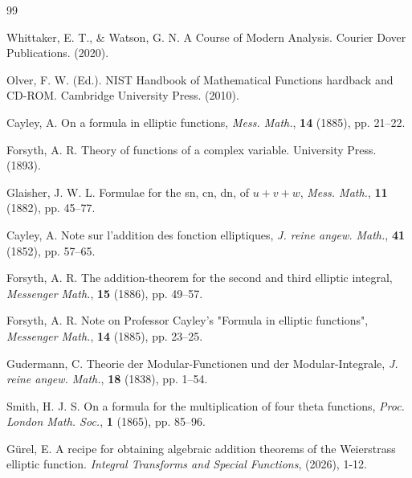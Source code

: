 \documentclass{amsart}
\theoremstyle{definition}
\begin{document}
\begin{thebibliography}{99}

 Whittaker, E. T., \& Watson, G. N. A Course of Modern Analysis. Courier Dover Publications. (2020).

 Olver, F. W. (Ed.). NIST Handbook of Mathematical Functions hardback and CD-ROM. Cambridge University Press. (2010).

 Cayley, A. On a formula in elliptic functions, \textit{Mess. Math.}, \textbf{14} (1885), pp. 21–22.


 Forsyth, A. R. Theory of functions of a complex variable. University Press. (1893).

 Glaisher, J. W. L. Formulae for the sn, cn, dn, of $u + v + w$, \textit{Mess. Math.}, \textbf{11} (1882), pp. 45–77.

 Cayley, A. Note sur l’addition des fonction elliptiques, \textit{J. reine angew. Math.}, \textbf{41} (1852), pp. 57–65.


 Forsyth,  A. R. The addition-theorem for the second and third elliptic integral,\textit{ Messenger Math.}, \textbf{15} (1886), pp. 49–57.


Forsyth,  A. R. Note on Professor Cayley’s "Formula in elliptic functions", \textit{Messenger Math.}, \textbf{14} (1885), pp. 23–25.

 Gudermann, C. Theorie der Modular-Functionen und der Modular-Integrale, \textit{J. reine angew. Math.},
\textbf{18} (1838), pp. 1–54.

  Smith, H. J. S. On a formula for the multiplication of four theta functions, \textit{Proc. London Math. Soc.}, \textbf{1} (1865), pp. 85–96.

 Gürel, E. A recipe for obtaining algebraic addition theorems of the Weierstrass elliptic function. \textit{Integral Transforms and Special Functions}, (2026), 1-12.

\end{thebibliography}
\end{document}
